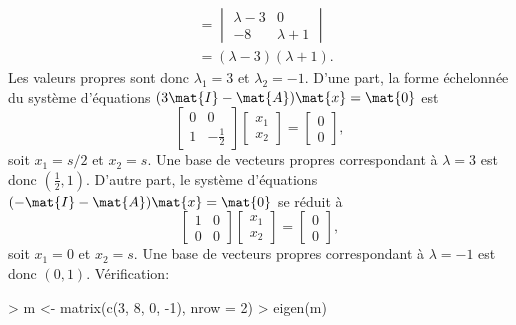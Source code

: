 \begin{exercice}
\begin{sol}
\begin{enumerate}
\begin{align*}
        &=
        \begin{vmatrix}
          \lambda - 3 & 0 \\
          -8 & \lambda + 1
        \end{vmatrix} \\
        &= (\lambda - 3)(\lambda + 1).
      \end{align*}
      Les valeurs propres sont donc $\lambda_1 = 3$ et $\lambda_2 =
      -1$. D'une part, la forme échelonnée du système d'équations $(3
      \mat{I} - \mat{A}) \mat{x} = \mat{0}$ est
      \begin{displaymath}
        \begin{bmatrix} 0 & 0 \\ 1 & -\frac{1}{2} \end{bmatrix}
        \begin{bmatrix} x_1 \\ x_2 \end{bmatrix} =
        \begin{bmatrix} 0 \\ 0 \end{bmatrix},
      \end{displaymath}
      soit $x_1 = s/2$ et $x_2 = s$. Une base de vecteurs propres
      correspondant à $\lambda = 3$ est donc $(\frac{1}{2}, 1)$.
      D'autre part, le système d'équations $(-\mat{I} - \mat{A})
      \mat{x} = \mat{0}$ se réduit à
      \begin{displaymath}
        \begin{bmatrix} 1 & 0 \\ 0 & 0 \end{bmatrix}
        \begin{bmatrix} x_1 \\ x_2 \end{bmatrix} =
        \begin{bmatrix} 0 \\ 0 \end{bmatrix},
      \end{displaymath}
      soit $x_1 = 0$ et $x_2 = s$. Une base de vecteurs propres
      correspondant à $\lambda = -1$ est donc $(0, 1)$. Vérification:
\begin{Schunk}
\begin{Sinput}
> m <- matrix(c(3, 8, 0, -1), nrow = 2)
> eigen(m)
\end{Sinput}
\end{Schunk}
\end{enumerate}
\end{sol}
\end{exercice}
